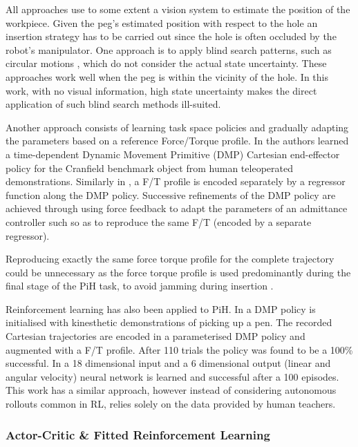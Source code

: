 \documentclass[final,5p,times,twocolumn]{elsarticle}
\begin{document}
All approaches use to some extent a vision system \cite{peg_personal_icra_2010} to estimate 
the position of the workpiece. Given  the peg's estimated position with respect to the hole 
an insertion strategy has to be carried out since the hole is often occluded by 
the robot's manipulator. One approach is to apply blind search patterns, such as circular 
motions \cite{search_strategies_icra_2001}, which do not consider the actual state uncertainty. 
These approaches work well when the peg is within the vicinity of the hole. In this work, with 
no visual information, high state uncertainty makes the direct application of such blind 
search methods ill-suited.

Another approach consists of learning task space policies and gradually adapting the parameters based on a reference
Force/Torque profile. In \cite{fast_peg_pbd_icmc_2014} the authors learned a time-dependent Dynamic Movement 
Primitive (DMP) \cite{Schaal04learningmovement} Cartesian end-effector policy for the Cranfield benchmark 
object from human teleoperated demonstrations. Similarly in \cite{trans_workpiece_icra_2013,sol_pdg_pbd_2014}, 
a F/T profile is encoded separately by a regressor function along the DMP policy. Successive refinements of 
the DMP policy are achieved through using force feedback to adapt the parameters of an admittance controller such 
so as to reproduce the same F/T (encoded by a separate regressor).

Reproducing exactly the same force torque profile for the complete trajectory could be 
unnecessary as the force torque profile is used predominantly during the final stage of the PiH task, 
to avoid jamming during insertion \cite[Chap. 5]{Kronander2015}. 

Reinforcement learning has also been applied to PiH. In \cite{learn_force_c_icirs_2011} a DMP policy is 
initialised with kinesthetic demonstrations of picking up a pen. The recorded Cartesian 
trajectories are encoded in a parameterised DMP policy and augmented with a F/T profile. 
After 110 trials the policy was found to be a 100\% successful. In \cite{learn_admittance_icra_1994} a 18 dimensional input 
and a 6 dimensional output (linear and angular velocity) neural network is learned and successful after a 100 episodes. 
This work has a similar approach, however instead of considering autonomous rollouts common in RL, 
relies solely on the data provided by human teachers.

\subsubsection{Actor-Critic \& Fitted Reinforcement Learning}
\end{document}
